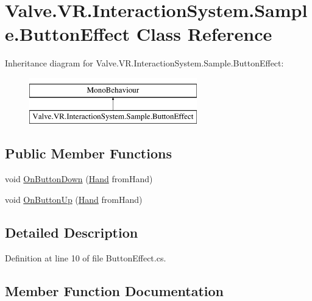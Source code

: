\hypertarget{class_valve_1_1_v_r_1_1_interaction_system_1_1_sample_1_1_button_effect}{}\section{Valve.\+V\+R.\+Interaction\+System.\+Sample.\+Button\+Effect Class Reference}
\label{class_valve_1_1_v_r_1_1_interaction_system_1_1_sample_1_1_button_effect}
Inheritance diagram for Valve.\+V\+R.\+Interaction\+System.\+Sample.\+Button\+Effect\+:\begin{figure}[H]
\begin{center}
\leavevmode
\includegraphics[height=2.000000cm]{class_valve_1_1_v_r_1_1_interaction_system_1_1_sample_1_1_button_effect}
\end{center}
\end{figure}
\subsection*{Public Member Functions}
\begin{DoxyCompactItemize}
\item 
void \mbox{\hyperlink{class_valve_1_1_v_r_1_1_interaction_system_1_1_sample_1_1_button_effect_a86220c510190277b9b151911daf3d6d3}{On\+Button\+Down}} (\mbox{\hyperlink{class_valve_1_1_v_r_1_1_interaction_system_1_1_hand}{Hand}} from\+Hand)
\item 
void \mbox{\hyperlink{class_valve_1_1_v_r_1_1_interaction_system_1_1_sample_1_1_button_effect_a5e20475a006861edb4dedca140eb49bf}{On\+Button\+Up}} (\mbox{\hyperlink{class_valve_1_1_v_r_1_1_interaction_system_1_1_hand}{Hand}} from\+Hand)
\end{DoxyCompactItemize}


\subsection{Detailed Description}


Definition at line 10 of file Button\+Effect.\+cs.



\subsection{Member Function Documentation}
\mbox{\label{class_valve_1_1_v_r_1_1_interaction_system_1_1_sample_1_1_button_effect_a86220c510190277b9b151911daf3d6d3}} 
